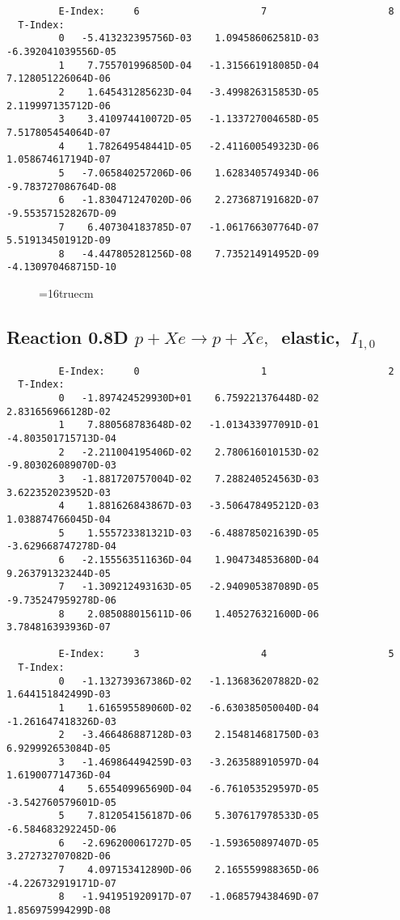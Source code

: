 \documentclass[12pt,dvipdfmx]{article}
\begin{document}
{\begin{small}
\begin{verbatim}
         E-Index:     6                     7                     8
  T-Index:
         0   -5.413232395756D-03    1.094586062581D-03   -6.392041039556D-05
         1    7.755701996850D-04   -1.315661918085D-04    7.128051226064D-06
         2    1.645431285623D-04   -3.499826315853D-05    2.119997135712D-06
         3    3.410974410072D-05   -1.133727004658D-05    7.517805454064D-07
         4    1.782649548441D-05   -2.411600549323D-06    1.058674617194D-07
         5   -7.065840257206D-06    1.628340574934D-06   -9.783727086764D-08
         6   -1.830471247020D-06    2.273687191682D-07   -9.553571528267D-09
         7    6.407304183785D-07   -1.061766307764D-07    5.519134501912D-09
         8   -4.447805281256D-08    7.735214914952D-09   -4.130970468715D-10
\end{verbatim}\end{small}


\begin{figure} \label{0.8T}
\epsfxsize=16truecm
\end{figure}

\newpage

\subsection{
Reaction 0.8D  $p + Xe \rightarrow p + Xe ,\ $
 elastic, $\  I_{1,0}$
}

\begin{small}\begin{verbatim}
         E-Index:     0                     1                     2
  T-Index:
         0   -1.897424529930D+01    6.759221376448D-02    2.831656966128D-02
         1    7.880568783648D-02   -1.013433977091D-01   -4.803501715713D-04
         2   -2.211004195406D-02    2.780616010153D-02   -9.803026089070D-03
         3   -1.881720757004D-02    7.288240524563D-03    3.622352023952D-03
         4    1.881626843867D-03   -3.506478495212D-03    1.038874766045D-04
         5    1.555723381321D-03   -6.488785021639D-05   -3.629668747278D-04
         6   -2.155563511636D-04    1.904734853680D-04    9.263791323244D-05
         7   -1.309212493163D-05   -2.940905387089D-05   -9.735247959278D-06
         8    2.085088015611D-06    1.405276321600D-06    3.784816393936D-07

         E-Index:     3                     4                     5
  T-Index:
         0   -1.132739367386D-02   -1.136836207882D-02    1.644151842499D-03
         1    1.616595589060D-02   -6.630385050040D-04   -1.261647418326D-03
         2   -3.466486887128D-03    2.154814681750D-03    6.929992653084D-05
         3   -1.469864494259D-03   -3.263588910597D-04    1.619007714736D-04
         4    5.655409965690D-04   -6.761053529597D-05   -3.542760579601D-05
         5    7.812054156187D-06    5.307617978533D-05   -6.584683292245D-06
         6   -2.696200061727D-05   -1.593650897407D-05    3.272732707082D-06
         7    4.097153412890D-06    2.165559988365D-06   -4.226732919171D-07
         8   -1.941951920917D-07   -1.068579438469D-07    1.856975994299D-08


\end{verbatim}
\end{small}}
\end{document}
